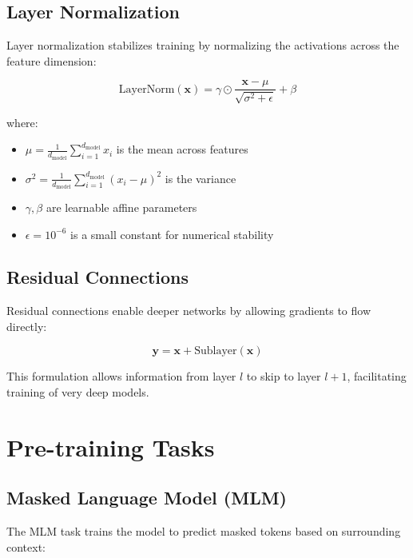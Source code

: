 \documentclass[11pt,a4paper]{article}
\begin{document}
\subsection{Layer Normalization}

Layer normalization stabilizes training by normalizing the activations across the feature dimension:

\begin{equation}
\text{LayerNorm}(\mathbf{x}) = \gamma \odot \frac{\mathbf{x} - \mu}{\sqrt{\sigma^2 + \epsilon}} + \beta
\end{equation}

where:
\begin{itemize}
    \item $\mu = \frac{1}{d_{\text{model}}}\sum_{i=1}^{d_{\text{model}}} x_i$ is the mean across features
    \item $\sigma^2 = \frac{1}{d_{\text{model}}}\sum_{i=1}^{d_{\text{model}}} (x_i - \mu)^2$ is the variance
    \item $\gamma, \beta$ are learnable affine parameters
    \item $\epsilon = 10^{-6}$ is a small constant for numerical stability
\end{itemize}

\subsection{Residual Connections}

Residual connections enable deeper networks by allowing gradients to flow directly:

\begin{equation}
\mathbf{y} = \mathbf{x} + \text{Sublayer}(\mathbf{x})
\end{equation}

This formulation allows information from layer $l$ to skip to layer $l+1$, facilitating training of very deep models.

\section{Pre-training Tasks}

\subsection{Masked Language Model (MLM)}

The MLM task trains the model to predict masked tokens based on surrounding context:
\end{document}
